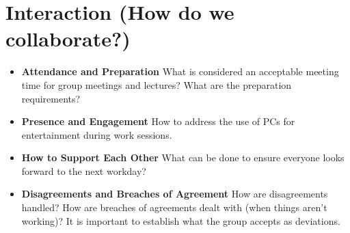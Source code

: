 \section*{Interaction (How do we collaborate?)}
\begin{itemize}
    \setlength{\itemsep}{5pt} %
    \item \textbf{Attendance and Preparation}  
    What is considered an acceptable meeting time for group meetings and lectures? What are the preparation requirements?

    \item \textbf{Presence and Engagement}  
    How to address the use of PCs for entertainment during work sessions.

    \item \textbf{How to Support Each Other}  
    What can be done to ensure everyone looks forward to the next workday?

    \item \textbf{Disagreements and Breaches of Agreement}  
    How are disagreements handled? How are breaches of agreements dealt with (when things aren’t working)? It is important to establish what the group accepts as deviations.
\end{itemize}
